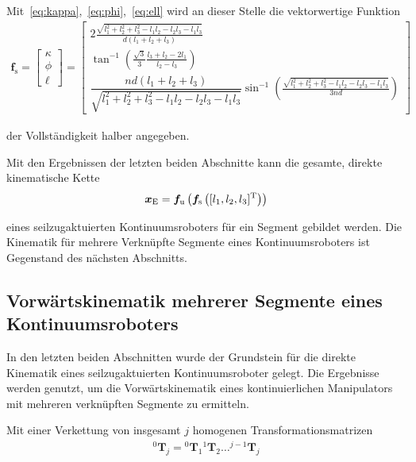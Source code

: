 Mit~\eqref{eq:kappa},~\eqref{eq:phi},~\eqref{eq:ell} wird an dieser Stelle die vektorwertige Funktion
\begin{align}
\bm{f}_{\mathrm{s}} =
\begin{bmatrix}
\kappa \\ \phi \\ \ell
\end{bmatrix} = 
\begin{bmatrix}
2\frac{\sqrt{l_1^2+l_2^2+l_3^2-l_1l_2-l_2l_3-l_1l_3}}{d(l_1+l_2+l_3)} \\
\tan^{-1}\left(\frac{\sqrt{3}}{3} \frac{l_3+l_2-2l_1}{l_2-l_3} \right) \\
\dfrac{nd(l_1+l_2+l_3)}{\sqrt{l_1^2+l_2^2+l_3^2-l_1l_2-l_2l_3-l_1l_3}} 
\sin^{-1}\left( \frac{\sqrt{l_1^2+l_2^2+l_3^2-l_1l_2-l_2l_3-l_1l_3}}{3nd} \right)
\end{bmatrix}
\label{eq:fSpezifischVektor}
\end{align}

der Vollständigkeit halber angegeben. \newline

Mit den Ergebnissen der letzten beiden Abschnitte kann die gesamte, direkte kinematische Kette  
\begin{align}
\bm{x}_\mathrm{E} = \bm{f}_\mathrm{u} \left( \bm{f}_\mathrm{s} \left( [l_1, l_2, l_3]^{\mathrm{T}} \right) \right)
\label{eq:kinematischeKette}
\end{align}

eines seilzugaktuierten Kontinuumsroboters für ein Segment gebildet werden. Die Kinematik für mehrere Verknüpfte Segmente eines Kontinuumsroboters ist Gegenstand des nächsten Abschnitts.

\subsection{Vorwärtskinematik mehrerer Segmente eines Kontinuumsroboters}
\label{subsec:multikinematik}

In den letzten beiden Abschnitten wurde der Grundstein für die direkte Kinematik eines seilzugaktuierten Kontinuumsroboter gelegt. Die Ergebnisse werden genutzt, um die Vorwärtskinematik eines kontinuierlichen Manipulators mit mehreren verknüpften Segmente zu ermitteln. \newline

Mit einer Verkettung von insgesamt $j$ homogenen Transformationsmatrizen
\begin{align}
{}^{0}\bm{T}_j = {}^{0}\bm{T}_{1} {}^1\bm{T}_{2} \dots {}^{j-1}\bm{T}_{j}
\end{align}

